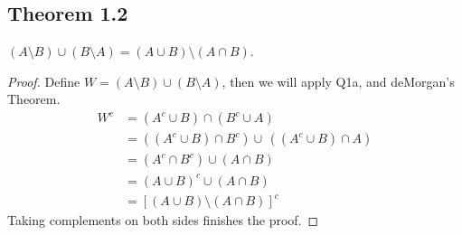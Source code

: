 \documentclass[../../main.tex]{subfiles}
\begin{document}
\subsection{Theorem 1.2}
\begin{wts}
    $(A\setminus B)\cup(B\setminus A) = (A\cup B)\setminus(A\cap B)$.
\end{wts}

\begin{proof}
    Define $W = (A\setminus B)\cup (B\setminus A)$, then we will apply Q1a, and deMorgan's Theorem.
\begin{align*}
    W^c &= (A^c\cup B)\cap(B^c\cup A)\\
    &=((A^c\cup B)\cap B^c) \cup\, ((A^c\cup B)\cap A)\\
    &= (A^c \cap B^c)\cup (A\cap B)\\
    &= (A\cup B)^c \cup (A\cap B)\\
    &= [(A\cup B)\setminus(A\cap B)]^c
\end{align*}
Taking complements on both sides finishes the proof.
\end{proof}
\end{document}

